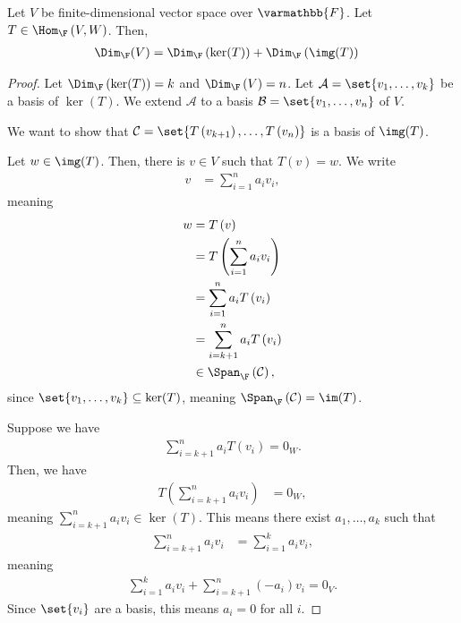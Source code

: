 \documentclass[10pt]{mypackage}
\renewcommand*{\mathbb}[1]{\varmathbb{#1}}
\begin{document}
\begin{theorem}
  Let $V$ be finite-dimensional vector space over $\mathbb{F}$. Let $T\in \Hom_{\F}\left(V,W\right)$. Then,
  \begin{align*}
    \Dim_{\F}(V) &= \Dim_{\F}\left(\ker (T)\right) + \Dim_{\F}\left(\img (T)\right)
  \end{align*}
\end{theorem}
\begin{proof}
  Let $\Dim_{\F}\left(\ker(T)\right) = k$ and $\Dim_{\F}\left(V\right) = n$. Let $\mathcal{A} = \set{v_1,\dots,v_k}$ be a basis of $\ker(T)$. We extend $\mathcal{A}$ to a basis $\mathcal{B} = \set{v_1,\dots,v_n}$ of $V$.\newline

  We want to show that $\mathcal{C} = \set{T\left(v_{k+1}\right),\dots,T\left(v_n\right)}$ is a basis of $\img(T)$.\newline

  Let $w\in \img(T)$. Then, there is $v\in V$ such that $T(v) = w$. We write
  \begin{align*}
    v &= \sum_{i=1}^{n}a_iv_i,
  \end{align*}
  meaning
  \begin{align*}
    w &= T\left(v\right)\\
      &= T\left(\sum_{i=1}^{n}a_iv_i\right)\\
      &= \sum_{i=1}^{n}a_iT\left(v_i\right)\\
      &= \sum_{i=k+1}^{n}a_iT\left(v_i\right)\\
      &\in \Span_{\F}\left(\mathcal{C}\right),
  \end{align*}
  since $\set{v_1,\dots,v_k}\subseteq \ker(T)$, meaning $\Span_{\F}\left(\mathcal{C}\right) = \im(T)$.\newline

  Suppose we have
  \begin{align*}
    \sum_{i=k+1}^{n}a_iT\left(v_i\right) = 0_W.
  \end{align*}
  Then, we have
  \begin{align*}
    T\left(\sum_{i=k+1}^{n}a_iv_i\right) &= 0_W,
  \end{align*}
  meaning $\sum_{i=k+1}^{n}a_iv_i\in \ker(T)$. This means there exist $a_1,\dots,a_k$ such that
  \begin{align*}
    \sum_{i=k+1}^{n}a_iv_i &= \sum_{i=1}^{k}a_iv_i,
  \end{align*}
  meaning
  \begin{align*}
    \sum_{i=1}^{k}a_iv_i + \sum_{i=k+1}^{n}\left(-a_i\right)v_i = 0_V.
  \end{align*}
  Since $\set{v_i}$ are a basis, this means $a_i = 0$ for all $i$.
\end{proof}
\end{document}
